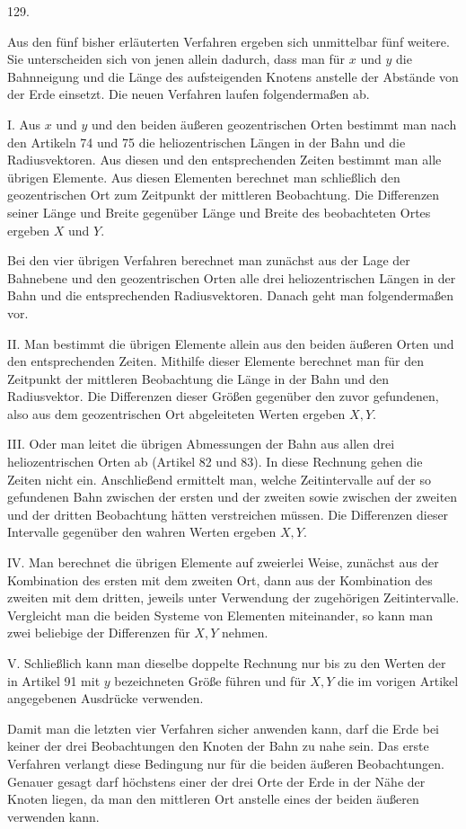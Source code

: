 \par{}\medskip
\begin{center}\hypertarget{native-176-article129}{}129.\end{center}
Aus den fünf bisher erläuterten Verfahren ergeben sich unmittelbar fünf weitere. Sie
unterscheiden sich von jenen allein dadurch, dass man für $x$ und $y$ die Bahnneigung und die Länge
des aufsteigenden Knotens anstelle der Abstände von der Erde einsetzt. Die neuen Verfahren laufen
folgendermaßen ab.

I. Aus $x$ und $y$ und den beiden äußeren geozentrischen Orten bestimmt man nach den Artikeln 74 und
75 die heliozentrischen Längen in der Bahn und die Radiusvektoren. Aus diesen und den entsprechenden
Zeiten bestimmt man alle übrigen Elemente. Aus diesen Elementen berechnet man schließlich den
geozentrischen Ort zum Zeitpunkt der mittleren Beobachtung. Die Differenzen seiner Länge und Breite
gegenüber Länge und Breite des beobachteten Ortes ergeben $X$ und $Y$.

Bei den vier übrigen Verfahren berechnet man zunächst aus der Lage der Bahnebene und den
geozentrischen Orten alle drei heliozentrischen Längen in der Bahn und die entsprechenden
Radiusvektoren. Danach geht man folgendermaßen vor.

II. Man bestimmt die übrigen Elemente allein aus den beiden äußeren Orten und den entsprechenden
Zeiten. Mithilfe dieser Elemente berechnet man für den Zeitpunkt der mittleren Beobachtung die Länge
in der Bahn und den Radiusvektor. Die Differenzen dieser Größen gegenüber den zuvor gefundenen, also
aus dem geozentrischen Ort abgeleiteten Werten ergeben $X,Y$.

III. Oder man leitet die übrigen Abmessungen der Bahn aus allen drei heliozentrischen Orten ab
(Artikel 82 und 83). In diese Rechnung gehen die Zeiten nicht ein. Anschließend ermittelt man,
welche Zeitintervalle auf der so gefundenen Bahn zwischen der ersten und der zweiten sowie zwischen
der zweiten und der dritten Beobachtung hätten verstreichen müssen. Die Differenzen dieser
Intervalle gegenüber den wahren Werten ergeben $X,Y$.

IV. Man berechnet die übrigen Elemente auf zweierlei Weise, zunächst aus der Kombination des ersten
mit dem zweiten Ort, dann aus der Kombination des zweiten mit dem dritten, jeweils unter Verwendung
der zugehörigen Zeitintervalle. Vergleicht man die beiden Systeme von Elementen miteinander, so kann
man zwei beliebige der Differenzen für $X,Y$ nehmen.

V. Schließlich kann man dieselbe doppelte Rechnung nur bis zu den Werten der in Artikel 91 mit $y$
bezeichneten Größe führen und für $X,Y$ die im vorigen Artikel angegebenen Ausdrücke verwenden.

Damit man die letzten vier Verfahren sicher anwenden kann, darf die Erde bei keiner der drei
Beobachtungen den Knoten der Bahn zu nahe sein. Das erste Verfahren verlangt diese Bedingung nur
für die beiden äußeren Beobachtungen. Genauer gesagt darf höchstens einer der drei Orte der Erde in
der Nähe der Knoten liegen, da man den mittleren Ort anstelle eines der beiden äußeren verwenden
kann.
